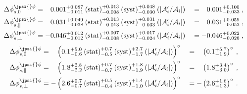 \begin{alignat}{2}
\Delta\phi^{\jpsi{}\phi}_{s,0} & = 
\phantom{-}0.001^{+0.087}_{-0.011}\:\text{(stat)}^{+0.013}_{-0.008}\:\text{(syst)}^{+0.048}_{-0.030}\:(|\mathcal{A}'_i/\mathcal{A}_i|)
&& = \phantom{-}0.001^{+0.100}_{-0.033}\:,\\
%
\Delta\phi^{\jpsi{}\phi}_{s,\parallel} & =
\phantom{-}0.031^{+0.049}_{-0.038}\:\text{(stat)}^{+0.013}_{-0.013}\:\text{(syst)}^{+0.031}_{-0.033}\:(|\mathcal{A}'_i/\mathcal{A}_i|)
&& = \phantom{-}0.031^{+0.059}_{-0.052}\:,\\
%
\Delta\phi^{\jpsi{}\phi}_{s,\perp} & =
-0.046^{+0.012}_{-0.012}\:\text{(stat)}^{+0.007}_{-0.008}\:\text{(syst)}^{+0.017}_{-0.024}\:(|\mathcal{A}'_i/\mathcal{A}_i|)
&& = -0.046^{+0.022}_{-0.028}\:,
\end{alignat}
\begin{alignat}{2}
\Delta\phi^{\jpsi{}\phi}_{s,0} & =
\phantom{-}\left(0.1^{+5.0}_{-0.6}\:\text{(stat)}^{+0.7}_{-0.5}\:\text{(syst)}^{+2.7}_{-1.7}\:(|\mathcal{A}'_i/\mathcal{A}_i|)\right)^{\circ}
&& = \phantom{-}\left(0.1^{+5.7}_{-1.9}\right)^{\circ}\:,\\
%
\Delta\phi^{\jpsi{}\phi}_{s,\parallel} & =
\phantom{-}\left(1.8^{+2.8}_{-2.2}\:\text{(stat)}^{+0.7}_{-0.7}\:\text{(syst)}^{+1.8}_{-1.9}\:(|\mathcal{A}'_i/\mathcal{A}_i|)\right)^{\circ}
&& = \phantom{-}\left(1.8^{+3.4}_{-3.0}\right)^{\circ}\:,\\
%
\Delta\phi^{\jpsi{}\phi}_{s,\perp} & = 
-\left(2.6^{+0.7}_{-0.7}\:\text{(stat)}^{+0.5}_{-0.4}\:\text{(syst)}^{+1.4}_{-1.0}\:(|\mathcal{A}'_i/\mathcal{A}_i|)\right)^{\circ}
&& = -\left(2.6^{+1.6}_{-1.3}\right)^{\circ}\:.
\end{alignat}

